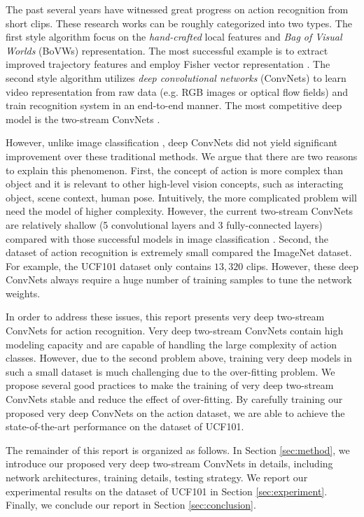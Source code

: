 \documentclass[10pt,twocolumn,letterpaper]{article}
\begin{document}
The past several years have witnessed great progress on action recognition from short clips. These research works can be roughly categorized into two types. The first style algorithm focus on the \emph{hand-crafted} local features and \emph{Bag of Visual Worlds} (BoVWs) representation. The most successful example is to extract improved trajectory features \cite{WangS13a} and employ Fisher vector representation \cite{SanchezPMV13}. The second style algorithm utilizes \emph{deep convolutional networks} (ConvNets) to learn video representation from raw data (e.g. RGB images or optical flow fields) and train recognition system in an end-to-end manner. The most competitive deep model is the two-stream ConvNets \cite{SimonyanZ14}.

However, unlike image classification \cite{KrizhevskySH12}, deep ConvNets did not yield significant improvement over these traditional methods. We argue that there are two reasons to explain this phenomenon. First, the concept of action is more complex than object and it is relevant to other high-level vision concepts, such as interacting object, scene context, human pose. Intuitively, the more complicated problem will need the model of higher complexity. However, the current two-stream ConvNets are relatively shallow (5 convolutional layers and 3 fully-connected layers) compared with those successful models in image classification \cite{SimonyanZ14a,SzegedyLJSRAEVR14}. Second, the dataset of action recognition is extremely small compared the ImageNet dataset. For example, the UCF101 dataset only contains $13,320$ clips. However, these deep ConvNets always require a huge number of training samples to tune the network weights.

In order to address these issues, this report presents very deep two-stream ConvNets for action recognition. Very deep two-stream ConvNets contain high modeling capacity and are capable of handling the large complexity of action classes. However, due to the second problem above, training very deep models in such a small dataset is much challenging due to the over-fitting problem. We propose several good practices to make the training of very deep two-stream ConvNets stable and reduce the effect of over-fitting. By carefully training our proposed very deep ConvNets on the action dataset, we are able to achieve the state-of-the-art performance on the dataset of UCF101.

The remainder of this report is organized as follows. In Section \ref{sec:method}, we introduce our proposed very deep two-stream ConvNets in details, including network architectures, training details, testing strategy. We report our experimental results on the dataset of UCF101 in Section \ref{sec:experiment}. Finally, we conclude our report in Section \ref{sec:conclusion}.
\end{document}
